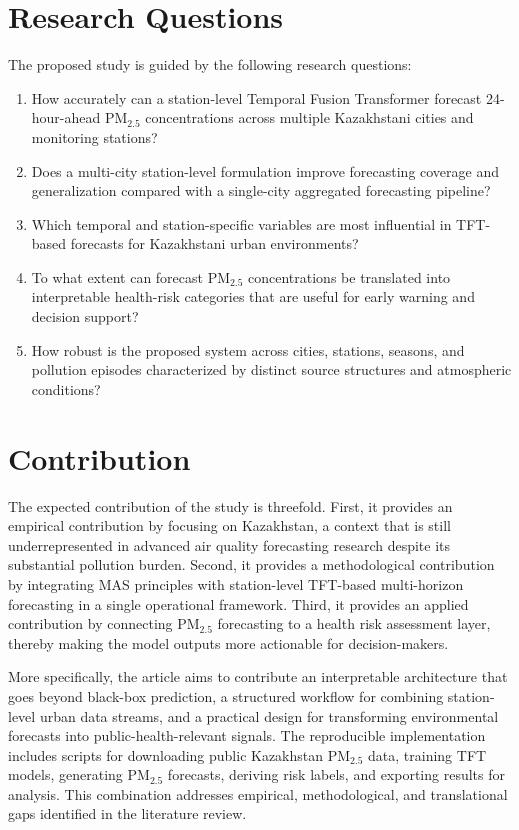 \documentclass[pdflatex,sn-mathphys-num]{sn-jnl}
\begin{document}
\section{Research Questions}\label{sec:rq}

The proposed study is guided by the following research questions:

\begin{enumerate}
\item How accurately can a station-level Temporal Fusion Transformer forecast 24-hour-ahead PM$_{2.5}$ concentrations across multiple Kazakhstani cities and monitoring stations?
\item Does a multi-city station-level formulation improve forecasting coverage and generalization compared with a single-city aggregated forecasting pipeline?
\item Which temporal and station-specific variables are most influential in TFT-based forecasts for Kazakhstani urban environments?
\item To what extent can forecast PM$_{2.5}$ concentrations be translated into interpretable health-risk categories that are useful for early warning and decision support?
\item How robust is the proposed system across cities, stations, seasons, and pollution episodes characterized by distinct source structures and atmospheric conditions?
\end{enumerate}

\section{Contribution}\label{sec:contribution}

The expected contribution of the study is threefold. First, it provides an empirical contribution by focusing on Kazakhstan, a context that is still underrepresented in advanced air quality forecasting research despite its substantial pollution burden. Second, it provides a methodological contribution by integrating MAS principles with station-level TFT-based multi-horizon forecasting in a single operational framework. Third, it provides an applied contribution by connecting PM$_{2.5}$ forecasting to a health risk assessment layer, thereby making the model outputs more actionable for decision-makers.

More specifically, the article aims to contribute an interpretable architecture that goes beyond black-box prediction, a structured workflow for combining station-level urban data streams, and a practical design for transforming environmental forecasts into public-health-relevant signals. The reproducible implementation includes scripts for downloading public Kazakhstan PM$_{2.5}$ data, training TFT models, generating PM$_{2.5}$ forecasts, deriving risk labels, and exporting results for analysis. This combination addresses empirical, methodological, and translational gaps identified in the literature review.
\end{document}
